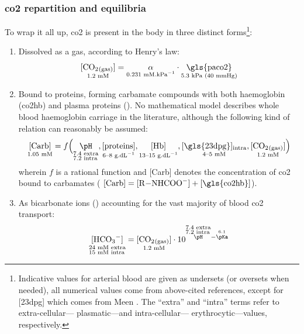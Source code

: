 \subsubsection{\texorpdfstring{\gls{co2}}{CO2} repartition and equilibria}

To wrap it all up, \gls{co2} is present in the body in three distinct forms\footnote{Indicative values for arterial blood are given as undersets (or oversets when needed), all numerical values come from above-cited references, except for [\gls{23dpg}] which comes from Meen \etal{}\cite{meen1981}. The \enquote{extra} and \enquote{intra} terms refer to extra-cellular---\ie{} plasmatic---and intra-cellular---\ie{} erythrocytic---values, respectively.}:
\begin{enumerate}
	\item Dissolved as a gas, according to Henry's law:\begin{equation}
		\underset{\text{1.2~mM}}{\ce{[CO2_{(gas)}]}} = \underset{\text{0.231~mM.kPa$^{-1}$}}{\alpha} \cdot \underset{\text{5.3~kPa (40~mmHg)}}{\text{\gls{paco2}}}
	\end{equation}
	\item Bound to proteins, forming carbamate compounds with both haemoglobin (\gls{co2hb}) and plasma proteins (). No mathematical model describes whole blood haemoglobin carriage in the literature, although the following kind of relation can reasonably be assumed:
	\begin{equation}\label{eq:co2hb:unknown_carb}
		\underset{\text{1.05~mM}}{[\text{Carb}]} = f\Bigl(
		\underset{
			\begin{subarray}{l}
				\text{7.4 extra}\\
				\text{7.2 intra}
			\end{subarray}}{\pH},
		\underset{\text{6--8~g.dL$^{-1}$}}{[\text{proteins}]}, 
		\underset{\text{13--15~g.dL$^{-1}$}}{[\text{Hb}]}, 
		\underset{\text{4--5~mM}}{[\text{\gls{23dpg}}]_{\text{intra}}},
		\underset{\text{1.2~mM}}{\ce{[CO2_{(gas)}]}} \Bigr)
	\end{equation} wherein $f$ is a rational function and [Carb] denotes the concentration of \gls{co2} bound to carbamates (\ie{} $[\text{Carb}] = [\ce{R-NHCOO-}] + [\text{\gls{co2hb}}]$).
	\item As bicarbonate ions () accounting for the vast majority of blood \gls{co2} transport:\begin{equation}
		\underset{\begin{subarray}{l}
				\text{24~mM extra}\\
				\text{15~mM intra}
			\end{subarray}}{\ce{[HCO3^-]}} = \underset{\text{1.2~mM}}{\ce{[CO2_{(gas)}]}}\cdot 10^{\overset{\begin{subarray}{l}
					\text{7.4 extra}\\
					\text{7.2 intra}
			\end{subarray}}{\pH} - \overset{6.1\vphantom{p}}{\pKa}}
	\end{equation}
\end{enumerate}

